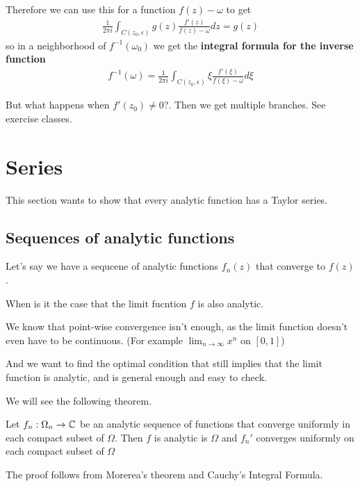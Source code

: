 Therefore we can use this for a function $f(z) - \omega$ to get
\begin{align*}
	\frac{1}{2\pi i} \int_{C(z_0,\epsilon)} g(z) \frac{f'(z)}{f(z) - \omega} dz = g(z)
\end{align*}
so in a neighborhood of $f^{-1}(\omega_0)$ we get the \textbf{integral formula for the inverse function}
\begin{align*}
	f^{-1}(\omega) = \frac{1}{2\pi i} \int_{C(z_0,\epsilon)} \xi \frac{f'(\xi)}{f(\xi) - \omega}d \xi
\end{align*}


But what happens when $f'(z_0) \neq 0$?. Then we get multiple branches. See exercise classes.


\section{Series}

This section wants to show that every analytic function has a Taylor series.

\subsection{Sequences of analytic functions}

Let's say we have a sequcene of analytic functions $f_n(z)$ that converge to $f(z)$.

When is it the case that the limit fucntion $f$ is also analytic.

We know that point-wise convergence isn't enough, as the limit function doesn't even have to be continuous. (For example $\lim_{n \to \infty} x^{n}$ on $[0,1]$)

And we want to find the optimal condition that still implies that the limit function is analytic, and is general enough and easy to check.

We will see the following theorem.
\begin{theorem}[Weierstrass]
Let $f_n: \Omega_n \to \mathbb{C}$ be an analytic sequence of functions that converge uniformly in each compact subset of $\Omega$. Then $f$ is analytic is $\Omega$ and $f_n'$ converges uniformly on each compact subset of $\Omega$
\end{theorem}


The proof follows from Morerea's theorem and Cauchy's Integral Formula.

